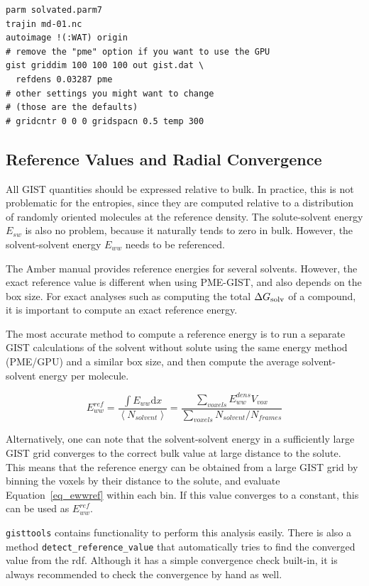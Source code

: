 \documentclass[9pt,tutorial]{livecoms}
\newcommand{\dgsolv}{\Delta G_\textup{solv}}
\newcommand{\software}{\texttt}
\newcommand\inlinecode{\texttt}
\begin{document}
\begin{lstlisting}
parm solvated.parm7
trajin md-01.nc
autoimage !(:WAT) origin
# remove the "pme" option if you want to use the GPU
gist griddim 100 100 100 out gist.dat \
  refdens 0.03287 pme
# other settings you might want to change
# (those are the defaults)
# gridcntr 0 0 0 gridspacn 0.5 temp 300
\end{lstlisting}
\subsection{Reference Values and Radial Convergence}
All GIST quantities should be expressed relative to bulk. In practice, this is not problematic for the entropies, since they are computed relative to a distribution of randomly oriented molecules at the reference density.
The solute-solvent energy $E_{sw}$ is also no problem, because it naturally tends to zero in bulk. 
However, the solvent-solvent energy $E_{ww}$ needs to be referenced.

The Amber manual provides reference energies for several solvents.
However, the exact reference value is different when using PME-GIST, and also depends on the box size.
For exact analyses such as computing the total $\dgsolv$ of a compound, it is important to compute an exact reference energy.

The most accurate method to compute a reference energy is to run a separate GIST calculations of the solvent without solute using the same energy method (PME/GPU) and a similar box size, and then compute the average solvent-solvent energy per molecule.

\begin{equation}
\label{eq_ewwref}
E_{ww}^\textit{ref} = \frac{\int{E_{ww}} \mathrm{d}x}{\left<N_\textit{solvent}\right>}
  = \frac{\sum_\textit{voxels}E_{ww}^\textit{dens} V_\textit{vox}}{\sum_\textit{voxels}{N_\textit{solvent}} / N_\textit{frames}}
\end{equation}

Alternatively, one can note that the solvent-solvent energy in a sufficiently large GIST grid converges to the correct bulk value at large distance to the solute.
This means that the reference energy can be obtained from a large GIST grid by binning the voxels by their distance to the solute, and evaluate Equation~\ref{eq_ewwref} within each bin.
If this value converges to a constant, this can be used as $E_{ww}^\textit{ref}$.

\software{gisttools} contains functionality to perform this analysis easily.
There is also a method \inlinecode{detect\_reference\_value} that automatically tries to find the converged value from the rdf.
Although it has a simple convergence check built-in, it is always recommended to check the convergence by hand as well.
\end{document}
